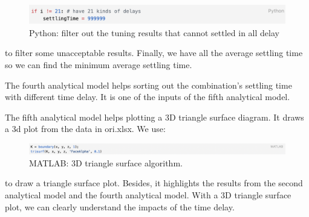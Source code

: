 \begin{figure}[htbp]
\centering
\includegraphics[width = .999\textwidth]{figure/3_4_2_code6.png}
\caption{Python: filter out the tuning results that cannot settled in all delay}
\label{3_4_2_code6}
\end{figure}

to filter some unacceptable results. Finally, we have all the average settling time so we can find the minimum average settling time. 

The fourth analytical model helps sorting out the combination’s settling time with different time delay. It is one of the inputs of the fifth analytical model. 

The fifth analytical model helps plotting a 3D triangle surface diagram. It draws a 3d plot from the data in ori.xlsx. We use: 

\begin{figure}[htbp]
\centering
\includegraphics[width = .999\textwidth]{figure/3_4_2_code7.png}
\caption{MATLAB: 3D triangle surface algorithm.}
\label{3_4_2_code7}
\end{figure}

to draw a triangle surface plot. Besides, it highlights the results from the second analytical model and the fourth analytical model. With a 3D triangle surface plot, we can clearly understand the impacts of the time delay. 